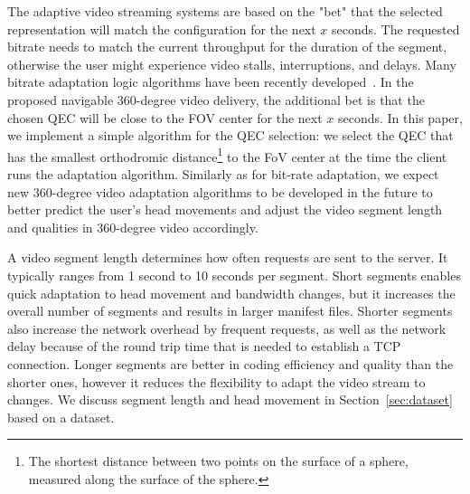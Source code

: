 The adaptive video streaming systems are based on the "bet" that the selected representation will match the configuration for the next $x$ seconds. The requested bitrate needs to match the current throughput for the duration of the segment, otherwise the user might experience video stalls, interruptions, and delays. Many bitrate adaptation logic algorithms have been recently developed~\cite{tian,probe_li_2014,miller,zou,liu}. In the proposed navigable 360-degree video delivery, the additional bet is that the chosen QEC will be close to the FOV center for the next $x$ seconds. In this paper, we implement a simple algorithm for the QEC selection: we select the QEC that has the smallest orthodromic distance\footnote{The shortest distance between two points on the surface of a sphere, measured along the surface of the sphere.} to the FoV center at the time the client runs the adaptation algorithm. 
Similarly as for bit-rate adaptation, we expect new 360-degree video adaptation algorithms to be developed in the future to better predict the user's head movements and adjust the video segment length and qualities in 360-degree video accordingly. %


 A video segment length determines how often requests are sent to the server. It typically ranges from 1 second to 10 seconds per segment. Short segments enables quick adaptation to head movement and bandwidth changes, but it increases the overall number of segments and results in larger manifest files. Shorter segments also increase the network overhead by frequent requests, as well as the network delay because of the round trip time that is needed to establish a TCP connection.
Longer segments are better in coding efficiency and quality than the shorter ones, however it reduces the flexibility to adapt the video stream to changes. We discuss segment length and head movement in Section~\ref{sec:dataset} based on a dataset.

